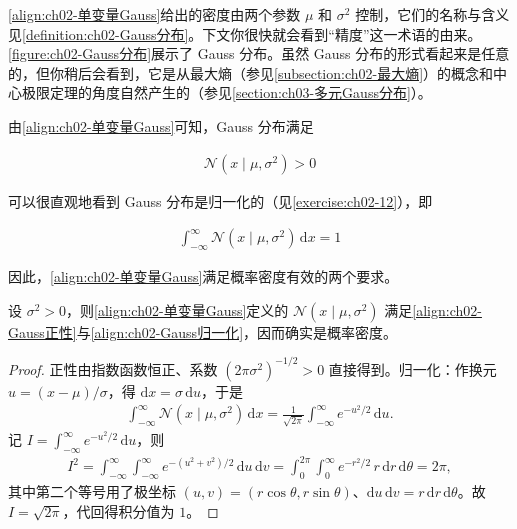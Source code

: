 \documentclass[../../main.tex]{subfiles}
\begin{document}
\eqref{align:ch02-单变量Gauss}给出的密度由两个参数 $\mu$ 和 $\sigma^{2}$ 控制，它们的名称与含义见\cref{definition:ch02-Gauss分布}。下文你很快就会看到“精度”这一术语的由来。\cref{figure:ch02-Gauss分布}展示了 Gauss 分布。虽然 Gauss 分布的形式看起来是任意的，但你稍后会看到，它是从最大熵（参见\cref{subsection:ch02-最大熵}）的概念和中心极限定理的角度自然产生的（参见\cref{section:ch03-多元Gauss分布}）。

由\eqref{align:ch02-单变量Gauss}可知，Gauss 分布满足

\begin{align}
  \mathcal{N}(x\mid\mu,\sigma^{2}) > 0
  \label{align:ch02-Gauss正性}
\end{align}

可以很直观地看到 Gauss 分布是归一化的（见\cref{exercise:ch02-12}），即

\begin{align}
  \int_{-\infty}^{\infty}\mathcal{N}(x\mid\mu,\sigma^{2})\,\mathrm{d}x = 1
  \label{align:ch02-Gauss归一化}
\end{align}

因此，\eqref{align:ch02-单变量Gauss}满足概率密度有效的两个要求。

\begin{proposition}\label{proposition:ch02-Gauss归一化}
设 $\sigma^{2}>0$，则\eqref{align:ch02-单变量Gauss}定义的 $\mathcal{N}(x\mid\mu,\sigma^{2})$ 满足\eqref{align:ch02-Gauss正性}与\eqref{align:ch02-Gauss归一化}，因而确实是概率密度。
\end{proposition}

\begin{proof}
正性由指数函数恒正、系数 $(2\pi\sigma^{2})^{-1/2}>0$ 直接得到。归一化：作换元 $u=(x-\mu)/\sigma$，得 $\mathrm{d}x=\sigma\,\mathrm{d}u$，于是
\begin{align*}
  \int_{-\infty}^{\infty}\mathcal{N}(x\mid\mu,\sigma^{2})\,\mathrm{d}x
  = \frac{1}{\sqrt{2\pi}}\int_{-\infty}^{\infty}e^{-u^{2}/2}\,\mathrm{d}u .
\end{align*}
记 $I=\int_{-\infty}^{\infty}e^{-u^{2}/2}\,\mathrm{d}u$，则
\begin{align*}
  I^{2} = \int_{-\infty}^{\infty}\!\!\int_{-\infty}^{\infty} e^{-(u^{2}+v^{2})/2}\,\mathrm{d}u\,\mathrm{d}v
  = \int_{0}^{2\pi}\!\!\int_{0}^{\infty} e^{-r^{2}/2}\,r\,\mathrm{d}r\,\mathrm{d}\theta = 2\pi ,
\end{align*}
其中第二个等号用了极坐标 $(u,v)=(r\cos\theta,r\sin\theta)$、$\mathrm{d}u\,\mathrm{d}v=r\,\mathrm{d}r\,\mathrm{d}\theta$。故 $I=\sqrt{2\pi}$，代回得积分值为 $1$。
\end{proof}
\end{document}
